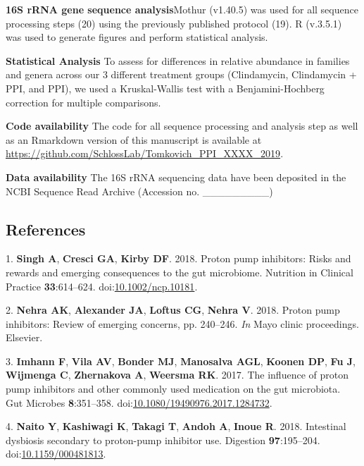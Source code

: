 \documentclass[11pt,]{article}
\begin{document}
\textbf{16S rRNA gene sequence analysis}Mothur (v1.40.5) was used for
all sequence processing steps (20) using the previously published
protocol (19). R (v.3.5.1) was used to generate figures and perform
statistical analysis.

\textbf{Statistical Analysis} To assess for differences in relative
abundance in families and genera across our 3 different treatment groups
(Clindamycin, Clindamycin + PPI, and PPI), we used a Kruskal-Wallis test
with a Benjamini-Hochberg correction for multiple comparisons.

\textbf{Code availability} The code for all sequence processing and
analysis step as well as an Rmarkdown version of this manuscript is
available at
\url{https://github.com/SchlossLab/Tomkovich_PPI_XXXX_2019}.

\textbf{Data availability} The 16S rRNA sequencing data have been
deposited in the NCBI Sequence Read Archive (Accession no.
\_\_\_\_\_\_\_\_\_)

\newpage

\subsection{References}\label{references}

\hypertarget{refs}{}
\hypertarget{ref-Singh2018}{}
1. \textbf{Singh A}, \textbf{Cresci GA}, \textbf{Kirby DF}. 2018. Proton
pump inhibitors: Risks and rewards and emerging consequences to the gut
microbiome. Nutrition in Clinical Practice \textbf{33}:614--624.
doi:\href{https://doi.org/10.1002/ncp.10181}{10.1002/ncp.10181}.

\hypertarget{ref-nehra2018proton}{}
2. \textbf{Nehra AK}, \textbf{Alexander JA}, \textbf{Loftus CG},
\textbf{Nehra V}. 2018. Proton pump inhibitors: Review of emerging
concerns, pp. 240--246. \emph{In} Mayo clinic proceedings. Elsevier.

\hypertarget{ref-Imhann2017}{}
3. \textbf{Imhann F}, \textbf{Vila AV}, \textbf{Bonder MJ},
\textbf{Manosalva AGL}, \textbf{Koonen DP}, \textbf{Fu J},
\textbf{Wijmenga C}, \textbf{Zhernakova A}, \textbf{Weersma RK}. 2017.
The influence of proton pump inhibitors and other commonly used
medication on the gut microbiota. Gut Microbes \textbf{8}:351--358.
doi:\href{https://doi.org/10.1080/19490976.2017.1284732}{10.1080/19490976.2017.1284732}.

\hypertarget{ref-Naito2018}{}
4. \textbf{Naito Y}, \textbf{Kashiwagi K}, \textbf{Takagi T},
\textbf{Andoh A}, \textbf{Inoue R}. 2018. Intestinal dysbiosis secondary
to proton-pump inhibitor use. Digestion \textbf{97}:195--204.
doi:\href{https://doi.org/10.1159/000481813}{10.1159/000481813}.
\end{document}
